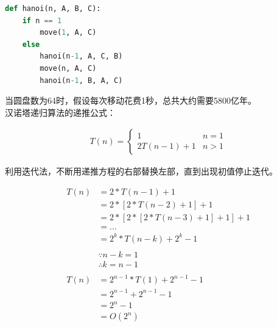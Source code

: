 \vspace{0.5cm}


\begin{lstlisting}[language=Python]
def hanoi(n, A, B, C):
    if n == 1
        move(1, A, C)
    else
        hanoi(n-1, A, C, B)
        move(n, A, C)
        hanoi(n-1, B, A, C)
\end{lstlisting}

当圆盘数为64时，假设每次移动花费1秒，总共大约需要5800亿年。 \\

汉诺塔递归算法的递推公式：

\vspace{-0.5cm}

\begin{align*}
    T(n) = \begin{cases}
        1             & n = 1 \\
        2T(n - 1) + 1 & n > 1
    \end{cases}
\end{align*}

利用迭代法，不断用递推方程的右部替换左部，直到出现初值停止迭代。

\vspace{-0.5cm}

\begin{align*}
    T(n) & = 2 * T(n - 1) + 1                     \\
         & = 2 * [ 2 * T(n - 2) + 1] + 1          \\
         & = 2 * [2 * [2 * T(n - 3) + 1] + 1] + 1 \\
         & = \dots                                \\
         & = 2^k * T(n - k) + 2^k - 1             \\
    \\
         & \because n - k = 1                     \\
         & \therefore k = n - 1                   \\
    \\
    T(n) & = 2^{n-1} * T(1) + 2^{n-1} - 1         \\
         & = 2^{n-1} + 2^{n-1} - 1                \\
         & = 2^n - 1                              \\
         & = O(2^n)
\end{align*}

